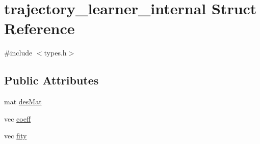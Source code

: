 \hypertarget{structtrajectory__learner__internal}{\section{trajectory\-\_\-learner\-\_\-internal \-Struct \-Reference}
\label{structtrajectory__learner__internal}
}


{\ttfamily \#include $<$types.\-h$>$}

\subsection*{\-Public \-Attributes}
\begin{DoxyCompactItemize}
\item 
mat \hyperlink{structtrajectory__learner__internal_a992d61017fe91308b53624c9ed5a2478}{des\-Mat}
\item 
vec \hyperlink{structtrajectory__learner__internal_a63ab582b55bfcba62b344cd9c77893a5}{coeff}
\item 
vec \hyperlink{structtrajectory__learner__internal_ac2aa3acad16fdf01628a14fae49a69ab}{fity}
\end{DoxyCompactItemize}


